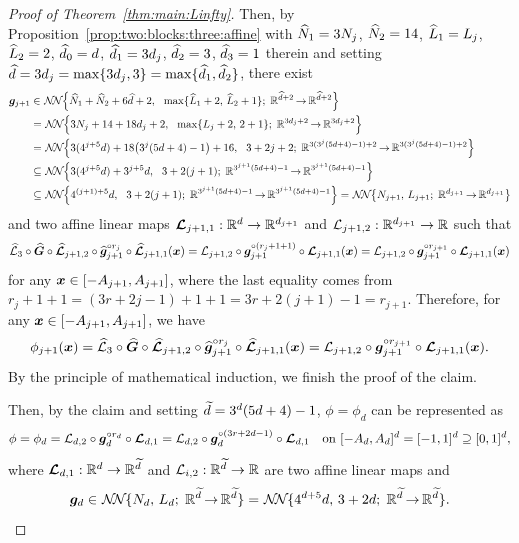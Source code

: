 \documentclass[nohyperref]{article}
\theoremstyle{plain}
\theoremstyle{definition}
\theoremstyle{remark}
\begin{document}
\begin{proof}[Proof of Theorem~\ref{thm:main:Linfty}]
Then, by Proposition~\ref{prop:two:blocks:three:affine} with 
${\widehat{N}}_1=3N_j$, ${\widehat{N}}_2=14$, ${\widehat{L}}_1=L_j$, ${\widehat{L}}_2=2$, ${\widehat{d}}_0=d$, ${\widehat{d}}_1=3d_j$, ${\widehat{d}}_2=3$, ${\widehat{d}}_3=1$ therein and setting  ${\widehat{d}}=3d_j=\max\{3d_j,3\}=\max\{{\widehat{d}}_1,{\widehat{d}}_2\}$, there exist
\begin{equation*}
\begin{split}
		\bmg_{j+1}
		&\in \nn[\Big]{\hatN_1+\hatN_2+6\hatd+2}{\hspace*{5pt}\max\{\hatL_1+2,\,\hatL_2+1\}}{\hatd+2}{\hatd+2}\\
  &= \nn[\Big]{3N_j+14+18d_j+2}{\hspace*{5pt}\max\{L_j+2,\,2+1\}}{3d_j+2}{3d_j+2}\\
		&=	 \nn[\Big]{3(4^{j+5}d)+18\big(3^j(5d+4)-1\big)+16}{\hspace*{5pt} 3+2j+2}{3(3^j(5d+4)-1)+2}{3(3^j(5d+4)-1)+2}\\
		&\subseteq  \nn[\Big]{3(4^{j+5}d)+ 3^{j+5}d}{\hspace*{5pt} 3+2(j+1)}{3^{j+1}(5d+4)-1}{ 
      3^{j+1}(5d+4)-1}\\
		&\subseteq  \nn[\Big]{4^{(j+1)+5}d}{\hspace*{5pt} 3+2(j+1)}{3^{j+1}(5d+4)-1}{3^{j+1}(5d+4)-1}
		= \nn[\big]{N_{j+1}}{L_{j+1}}{d_{j+1}}{d_{j+1}}
\end{split}
\end{equation*}
and two affine linear maps $\bmcalL_{j+1,1}:\R^d\to\R^{d_{j+1}}$ and $\calL_{j+1,2}:\R^{d_{j+1}}\to\R$ such that
\begin{equation*}
	{\mathcal{\widehat{L}}}_3\circ {\bm{\widehat{G}}} \circ {\bm{\mathcal{\widehat{L}}}}_{j+1,2}\circ {\bm{\widehat{g}}}_{j+1}^{\circ r_j}\circ {\bm{\mathcal{\widehat{L}}}}_{j+1,1}({\bm{x}})={\mathcal{L}}_{j+1,2}\circ {\bm{g}}_{j+1}^{\circ (r_j+1+1)} \circ {\bm{\mathcal{L}}}_{j+1,1}({\bm{x}})={\mathcal{L}}_{j+1,2}\circ {\bm{g}}_{j+1}^{\circ r_{j+1}} \circ {\bm{\mathcal{L}}}_{j+1,1}({\bm{x}})
\end{equation*}
for any ${\bm{x}}\in [-A_{j+1},A_{j+1}]$,
where the last equality comes from $r_j+1+1=(3r+2j-1)+1+1=3r+2(j+1)-1=r_{j+1}$. Therefore,
for any ${\bm{x}}\in [-A_{j+1},A_{j+1}]$, we have
\begin{equation*}
	\phi_{j+1}({\bm{x}})
	={\mathcal{\widehat{L}}}_3\circ {\bm{\widehat{G}}} \circ {\bm{\mathcal{\widehat{L}}}}_{j+1,2}\circ {\bm{\widehat{g}}}_{j+1}^{\circ r_j}\circ {\bm{\mathcal{\widehat{L}}}}_{j+1,1}({\bm{x}})=
	{\mathcal{L}}_{j+1,2}\circ {\bm{g}}_{j+1}^{\circ r_{j+1}} \circ {\bm{\mathcal{L}}}_{j+1,1}({\bm{x}}).
\end{equation*}
By the principle of mathematical induction,  we finish the proof of the claim. 

Then, by the claim and setting ${\widetilde{d}}=3^d(5d+4)-1$, $\phi=\phi_d$ can be represented as 
\begin{equation*}
	\phi=\phi_d={\mathcal{L}}_{d,2}\circ {\bm{g}}_d^{\circ r_d}\circ{\bm{\mathcal{L}}}_{d,1}
={\mathcal{L}}_{d,2}\circ {\bm{g}}_d^{\circ (3r+2d-1)}\circ{\bm{\mathcal{L}}}_{d,1} \quad \textnormal{on $[-A_d,A_d]^d=[-1,1]^d\supseteq [0,1]^d$},
\end{equation*}
where $\bmcalL_{d,1}:\R^d\to\R^{\tilded}$ and $\calL_{i,2}:\R^{\tilded}\to\R$ are two affine linear maps and 
\begin{equation*}
    \bmg_d\in \nn{N_d }{L_d}{\tilded}{\tilded}=\nn{4^{d+5}d}{3+2d}{\tilded}{\tilded}.
\end{equation*}


\end{proof}
\end{document}
